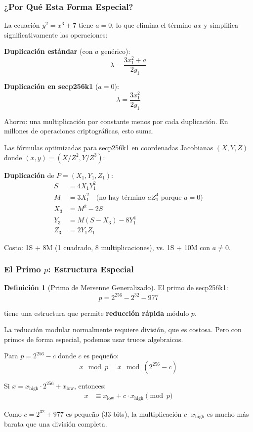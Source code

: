 \documentclass[11pt,a4paper,twoside,openright]{book}
\theoremstyle{definition}
\newtheorem{definition}{Definición}[chapter]
\theoremstyle{plain}
\theoremstyle{remark}
\begin{document}
\subsubsection{¿Por Qué Esta Forma Especial?}

\begin{keyidea}
La ecuación $y^2 = x^3 + 7$ tiene $a = 0$, lo que elimina el término $ax$ y simplifica significativamente las operaciones:

\textbf{Duplicación estándar} (con $a$ genérico):
\[ \lambda = \frac{3x_1^2 + a}{2y_1} \]

\textbf{Duplicación en secp256k1} ($a = 0$):
\[ \lambda = \frac{3x_1^2}{2y_1} \]

Ahorro: una multiplicación por constante menos por cada duplicación. En millones de operaciones criptográficas, esto suma.
\end{keyidea}

\begin{mathnote}
Las fórmulas optimizadas para secp256k1 en coordenadas Jacobianas $(X, Y, Z)$ donde $(x, y) = (X/Z^2, Y/Z^3)$:

\textbf{Duplicación} de $P = (X_1, Y_1, Z_1)$:
\begin{align}
S &= 4 X_1 Y_1^2 \\
M &= 3 X_1^2 \quad \text{(no hay término } aZ_1^4 \text{ porque } a = 0\text{)} \\
X_3 &= M^2 - 2S \\
Y_3 &= M(S - X_3) - 8Y_1^4 \\
Z_3 &= 2Y_1 Z_1
\end{align}

Costo: 1S + 8M (1 cuadrado, 8 multiplicaciones), vs. 1S + 10M con $a \neq 0$.
\end{mathnote}

\subsubsection{El Primo $p$: Estructura Especial}

\begin{definition}[Primo de Mersenne Generalizado]
El primo de secp256k1:
\[ p = 2^{256} - 2^{32} - 977 \]

tiene una estructura que permite \textbf{reducción rápida} módulo $p$.
\end{definition}

\begin{intuicion}
La reducción modular normalmente requiere división, que es costosa. Pero con primos de forma especial, podemos usar trucos algebraicos.

Para $p = 2^{256} - c$ donde $c$ es pequeño:
\[ x \mod p = x \mod (2^{256} - c) \]

Si $x = x_{\text{high}} \cdot 2^{256} + x_{\text{low}}$, entonces:
\begin{align}
x &\equiv x_{\text{low}} + c \cdot x_{\text{high}} \pmod{p}
\end{align}

Como $c = 2^{32} + 977$ es pequeño (33 bits), la multiplicación $c \cdot x_{\text{high}}$ es mucho más barata que una división completa.
\end{intuicion}
\end{document}
